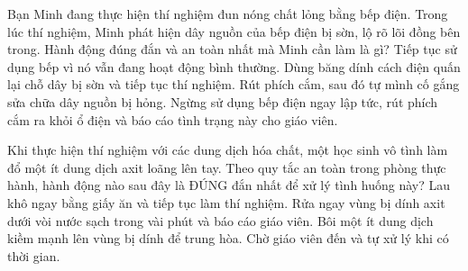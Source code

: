 \begin{ex}
Bạn Minh đang thực hiện thí nghiệm đun nóng chất lỏng bằng bếp điện. Trong lúc thí nghiệm, Minh phát hiện dây nguồn của bếp điện bị sờn, lộ rõ lõi đồng bên trong. Hành động đúng đắn và an toàn nhất mà Minh cần làm là gì?
\choice
{Tiếp tục sử dụng bếp vì nó vẫn đang hoạt động bình thường.}
{Dùng băng dính cách điện quấn lại chỗ dây bị sờn và tiếp tục thí nghiệm.}
{Rút phích cắm, sau đó tự mình cố gắng sửa chữa dây nguồn bị hỏng.}
{\True Ngừng sử dụng bếp điện ngay lập tức, rút phích cắm ra khỏi ổ điện và báo cáo tình trạng này cho giáo viên.}
\end{ex}

\begin{ex}
Khi thực hiện thí nghiệm với các dung dịch hóa chất, một học sinh vô tình làm đổ một ít dung dịch axit loãng lên tay. Theo quy tắc an toàn trong phòng thực hành, hành động nào sau đây là ĐÚNG đắn nhất để xử lý tình huống này?
\choice
{Lau khô ngay bằng giấy ăn và tiếp tục làm thí nghiệm.}
{\True Rửa ngay vùng bị dính axit dưới vòi nước sạch trong vài phút và báo cáo giáo viên.}
{Bôi một ít dung dịch kiềm mạnh lên vùng bị dính để trung hòa.}
{Chờ giáo viên đến và tự xử lý khi có thời gian.}
\end{ex}

